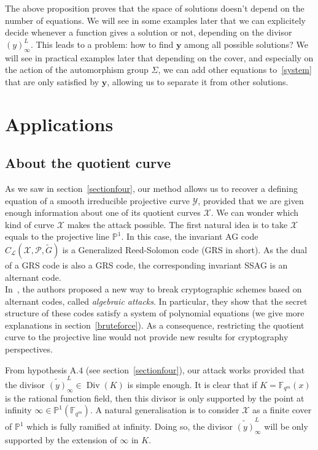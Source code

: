 \documentclass[10pt]{article}
\theoremstyle{definition}
\theoremstyle{definition}
\theoremstyle{definition}
\newcommand{\X}{\mathcal{X}}
\newcommand{\Y}{\mathcal{Y}}
\newcommand{\PR}{\mathcal{P}}
\newcommand{\Div}{\operatorname{Div}}
\newcommand{\calL}{\mathcal{L}}
\begin{document}
The above proposition proves that the space of solutions doesn't depend on the number of equations. 
We will see in some examples later that we can explicitely decide whenever a function gives a solution or not, depending on the divisor $(y)^L_{\infty}$. This leads to a problem: how to find $\mathbf{y}$ among all possible solutions? We will see in practical examples later that depending on the cover, and especially on the action of the automorphism group $\Sigma$,  we can add other equations to~\eqref{system} that are only satisfied by $\mathbf{y}$, allowing us to separate it from other solutions.

\section{Applications}
\label{sectionKummerArtinSchreier}

\subsection{About the quotient curve}

As we saw in section~\ref{sectionfour}, our method allows us to recover a defining equation of a smooth irreducible projective curve $\Y$, provided that we are given enough information about one of its quotient curves $\X$. We can wonder which kind of curve $\X$ makes the attack possible. The first natural idea is to take $\X$ equals to the projective line $\mathbb{P}^1$. In this case, the invariant AG code $C_{\calL}(\X,\PR,\tilde{G})$ is a Generalized Reed-Solomon code (GRS in short). As the dual of a GRS code is also a GRS code, the corresponding invariant SSAG is an alternant code.\\
In~\cite{FOP2}, the authors proposed a new way to break cryptographic schemes based on alternant codes, called \emph{algebraic attacks}. In particular, they show that the secret structure of these codes satisfy a system of polynomial equations (we give more explanations in section~\ref{bruteforce}). As a consequence, restricting the quotient curve to the projective line would not provide new results for cryptography perspectives.

From hypothesis A.$4$ (see section~\ref{sectionfour}), our attack works provided that the divisor $\widetilde{(y)}^L_{\infty} \in \Div(K)$ is simple enough. It is clear that if $K=\mathbb{F}_{q^m}(x)$ is the rational function field, then this divisor is only supported by the point at infinity $\infty \in \mathbb{P}^1(\mathbb{F}_{q^m})$.
A natural generalisation is to consider $\X$ as a finite cover of $\mathbb{P}^1$ which is fully ramified at infinity. Doing so, the divisor $\widetilde{(y)}^L_{\infty}$ will be only supported by the extension of $\infty$ in $K$.
\end{document}

